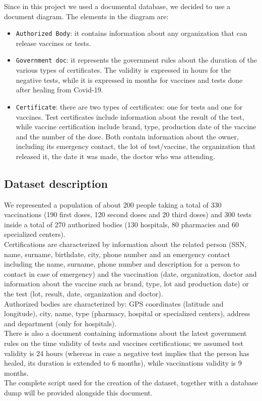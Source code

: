 \documentclass[12pt, a4paper]{article}
\begin{document}
\noindent 
Since in this project we used a documental database, we decided to use a document diagram.
The elements in the diagram are:
\begin{itemize}
    \item \texttt{Authorized Body}: it contains information about any organization that can release vaccines or tests.
    \item \texttt{Government doc}: it represents the government rules about the duration of the various types of certificates. The validity is expressed in hours for the negative tests, while it is expressed in months for vaccines and tests done after healing from Covid-19.
    \item \texttt{Certificate}: there are two types of certificates: one for tests and one for vaccines. Test certificates include information about the result of the test, while vaccine certification include brand, type, production date of the vaccine and the number of the dose. Both contain information about the owner, including its emergency contact, the lot of test/vaccine, the organization that released it, the date it was made, the doctor who was attending.

\end{itemize}
\subsection{Dataset description}

We represented a population of about 200 people taking a total of 330 vaccinations
(190 first doses, 120 second doses and 20 third doses) and 300 tests inside
a total of 270 authorized bodies (130 hospitals, 80 pharmacies and 60 
specialized centers). \\
Certifications are characterized by information about the related person
(SSN, name, surname, birthdate, city, phone number and an emergency contact
including the name, surname, phone number and description for a person to 
contact in case of emergency) and the vaccination (date, organization, doctor 
and information about the vaccine such as brand, type, lot and production 
date) or the test (lot, result, date, organization and doctor). \\
Authorized bodies are characterized by: GPS coordinates (latitude and longitude), city,
name, type (pharmacy, hospital or specialized centers), address and department 
(only for hospitals). \\
There is also a document containing informations about the latest government rules
on the time validity of tests and vaccines certifications; we assumed test validity is 
24 hours (whereas in case a negative test implies that the person has healed, its 
duration is extended to 6 months), while vaccinations validity is 9 months. \\
The complete script used for the creation of the dataset, together with a 
database dump will be provided alongside this document.
\end{document}
